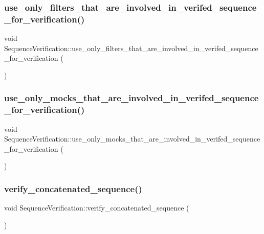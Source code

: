 \subsubsection{\texorpdfstring{use\_only\_filters\_that\_are\_involved\_in\_verifed\_sequence\_for\_verification()}{use\_only\_filters\_that\_are\_involved\_in\_verifed\_sequence\_for\_verification()}}
{\footnotesize\ttfamily void Sequence\+Verification\+::use\+\_\+only\+\_\+filters\+\_\+that\+\_\+are\+\_\+involved\+\_\+in\+\_\+verifed\+\_\+sequence\+\_\+for\+\_\+verification (\begin{DoxyParamCaption}{ }\end{DoxyParamCaption})\hspace{0.3cm}{\ttfamily [inline]}}

\mbox{\label{structSequenceVerification_a2c72c33292383012c848032b10b82b1b}} 
\subsubsection{\texorpdfstring{use\_only\_mocks\_that\_are\_involved\_in\_verifed\_sequence\_for\_verification()}{use\_only\_mocks\_that\_are\_involved\_in\_verifed\_sequence\_for\_verification()}}
{\footnotesize\ttfamily void Sequence\+Verification\+::use\+\_\+only\+\_\+mocks\+\_\+that\+\_\+are\+\_\+involved\+\_\+in\+\_\+verifed\+\_\+sequence\+\_\+for\+\_\+verification (\begin{DoxyParamCaption}{ }\end{DoxyParamCaption})\hspace{0.3cm}{\ttfamily [inline]}}

\mbox{\label{structSequenceVerification_a94df80b73e843bbdde306d3a6237e259}} 
\subsubsection{\texorpdfstring{verify\_concatenated\_sequence()}{verify\_concatenated\_sequence()}}
{\footnotesize\ttfamily void Sequence\+Verification\+::verify\+\_\+concatenated\+\_\+sequence (\begin{DoxyParamCaption}{ }\end{DoxyParamCaption})\hspace{0.3cm}{\ttfamily [inline]}}

